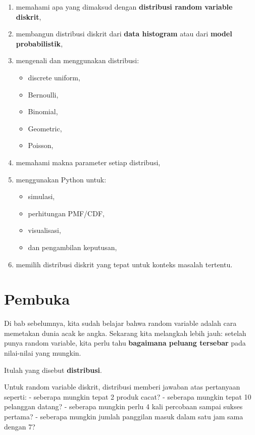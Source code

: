 \documentclass[
  letterpaper,
  DIV=11,
  numbers=noendperiod]{scrreprt}
\providecommand{\tightlist}{%
  \setlength{\itemsep}{0pt}\setlength{\parskip}{0pt}}
\begin{document}
\begin{enumerate}
\def\labelenumi{\arabic{enumi}.}
\tightlist
\item
  memahami apa yang dimaksud dengan \textbf{distribusi random variable
  diskrit},
\item
  membangun distribusi diskrit dari \textbf{data histogram} atau dari
  \textbf{model probabilistik},
\item
  mengenali dan menggunakan distribusi:

  \begin{itemize}
  \tightlist
  \item
    discrete uniform,
  \item
    Bernoulli,
  \item
    Binomial,
  \item
    Geometric,
  \item
    Poisson,
  \end{itemize}
\item
  memahami makna parameter setiap distribusi,
\item
  menggunakan Python untuk:

  \begin{itemize}
  \tightlist
  \item
    simulasi,
  \item
    perhitungan PMF/CDF,
  \item
    visualisasi,
  \item
    dan pengambilan keputusan,
  \end{itemize}
\item
  memilih distribusi diskrit yang tepat untuk konteks masalah tertentu.
\end{enumerate}

\section{Pembuka}\label{pembuka-2}

Di bab sebelumnya, kita sudah belajar bahwa random variable adalah cara
memetakan dunia acak ke angka. Sekarang kita melangkah lebih jauh:
setelah punya random variable, kita perlu tahu \textbf{bagaimana peluang
tersebar} pada nilai-nilai yang mungkin.

Itulah yang disebut \textbf{distribusi}.

Untuk random variable diskrit, distribusi memberi jawaban atas
pertanyaan seperti: - seberapa mungkin tepat 2 produk cacat? - seberapa
mungkin tepat 10 pelanggan datang? - seberapa mungkin perlu 4 kali
percobaan sampai sukses pertama? - seberapa mungkin jumlah panggilan
masuk dalam satu jam sama dengan 7?
\end{document}
